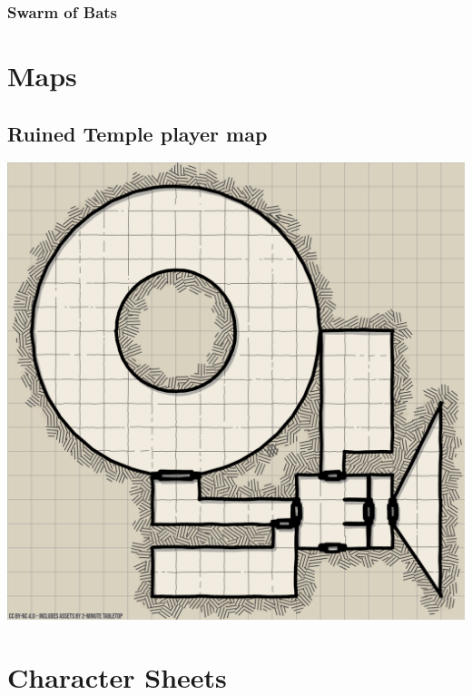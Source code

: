 \documentclass[10pt,onecolumn,twoside,openany,bg=full,layout=true]{dndbook}
\begin{document}
\subsection{Swarm of Bats}\label{subsec:swarm-of-bats}
\lipsum[1]

\vfill
\newpage

\chapter{Maps}\label{ch:maps}
\section{Ruined Temple player map}\label{sec:ruined-temple}
\includegraphics[width=1\textwidth]{img/maps/ruined_temple_map_19x19}
\chapter{Character Sheets}\label{ch:charactersheets}
\end{document}
